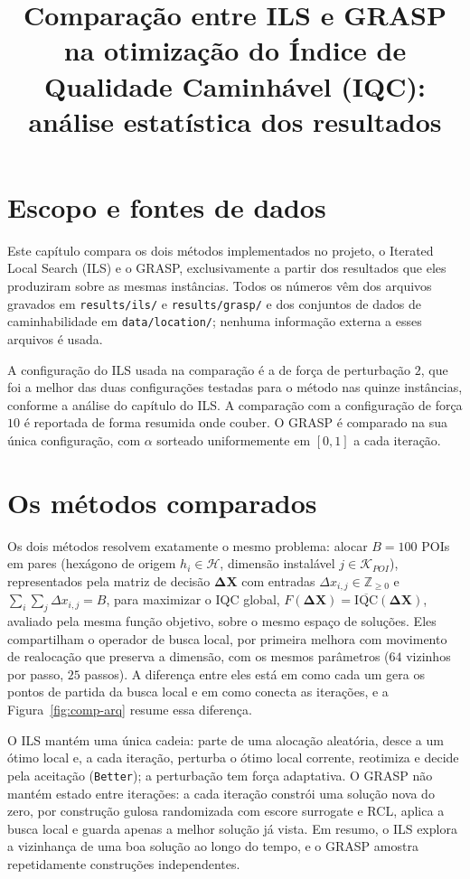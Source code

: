 \documentclass[11pt,a4paper]{article}
\title{Comparação entre ILS e GRASP na otimização do Índice de Qualidade Caminhável (IQC):\\ análise estatística dos resultados}
\author{}
\date{}
\newcommand{\code}[1]{\texttt{#1}}
\begin{document}
\maketitle

\section{Escopo e fontes de dados}
\label{sec:comp-escopo}

Este capítulo compara os dois métodos implementados no projeto, o Iterated Local Search (ILS) e o GRASP, exclusivamente a partir dos resultados que eles produziram sobre as mesmas instâncias. Todos os números vêm dos arquivos gravados em \code{results/ils/} e \code{results/grasp/} e dos conjuntos de dados de caminhabilidade em \code{data/location/}; nenhuma informação externa a esses arquivos é usada.

A configuração do ILS usada na comparação é a de força de perturbação $2$, que foi a melhor das duas configurações testadas para o método nas quinze instâncias, conforme a análise do capítulo do ILS. A comparação com a configuração de força $10$ é reportada de forma resumida onde couber. O GRASP é comparado na sua única configuração, com $\alpha$ sorteado uniformemente em $[0,1]$ a cada iteração.

\section{Os métodos comparados}
\label{sec:comp-metodos}

Os dois métodos resolvem exatamente o mesmo problema: alocar $B = 100$ POIs em pares (hexágono de origem $h_i \in \mathcal{H}$, dimensão instalável $j \in \mathcal{K}_{POI}$), representados pela matriz de decisão $\mathbf{\Delta X}$ com entradas $\Delta x_{i,j} \in \mathbb{Z}_{\ge 0}$ e $\sum_i \sum_j \Delta x_{i,j} = B$, para maximizar o IQC global, $F(\mathbf{\Delta X}) = \overline{\mathrm{IQC}}(\mathbf{\Delta X})$, avaliado pela mesma função objetivo, sobre o mesmo espaço de soluções. Eles compartilham o operador de busca local, por primeira melhora com movimento de realocação que preserva a dimensão, com os mesmos parâmetros ($64$ vizinhos por passo, $25$ passos). A diferença entre eles está em como cada um gera os pontos de partida da busca local e em como conecta as iterações, e a Figura~\ref{fig:comp-arq} resume essa diferença.

O ILS mantém uma única cadeia: parte de uma alocação aleatória, desce a um ótimo local e, a cada iteração, perturba o ótimo local corrente, reotimiza e decide pela aceitação (\code{Better}); a perturbação tem força adaptativa. O GRASP não mantém estado entre iterações: a cada iteração constrói uma solução nova do zero, por construção gulosa randomizada com escore surrogate e RCL, aplica a busca local e guarda apenas a melhor solução já vista. Em resumo, o ILS explora a vizinhança de uma boa solução ao longo do tempo, e o GRASP amostra repetidamente construções independentes.
\end{document}
